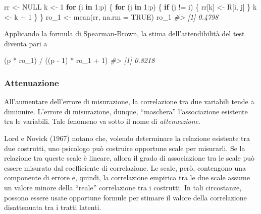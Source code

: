 \documentclass[
  11pt,
]{krantz}
\makeatletter
\newenvironment{Shaded}{\begin{snugshade}}{\end{snugshade}}
\newcommand{\AttributeTok}[1]{\textcolor[rgb]{0.61,0.61,0.61}{#1}}
\newcommand{\CommentTok}[1]{\textcolor[rgb]{0.37,0.37,0.37}{\textit{#1}}}
\newcommand{\ConstantTok}[1]{\textcolor[rgb]{0,0,0}{#1}}
\newcommand{\ControlFlowTok}[1]{\textcolor[rgb]{0.27,0.27,0.27}{\textbf{#1}}}
\newcommand{\DecValTok}[1]{\textcolor[rgb]{0.06,0.06,0.06}{#1}}
\newcommand{\FunctionTok}[1]{\textcolor[rgb]{0,0,0}{#1}}
\newcommand{\NormalTok}[1]{#1}
\newcommand{\OtherTok}[1]{\textcolor[rgb]{0.37,0.37,0.37}{#1}}
\newcommand{\SpecialCharTok}[1]{\textcolor[rgb]{0,0,0}{#1}}
\newenvironment{kframe}{%
\medskip{}
\setlength{\fboxsep}{.8em}
 \def\at@end@of@kframe{}%
 \ifinner\ifhmode%
  \def\at@end@of@kframe{\end{minipage}}%
  \begin{minipage}{\columnwidth}%
 \fi\fi%
 \def\FrameCommand##1{\hskip\@totalleftmargin \hskip-\fboxsep
 \colorbox{shadecolor}{##1}\hskip-\fboxsep
     \hskip-\linewidth \hskip-\@totalleftmargin \hskip\columnwidth}%
 \MakeFramed {\advance\hsize-\width
   \@totalleftmargin\z@ \linewidth\hsize
   \@setminipage}}%
 {\par\unskip\endMakeFramed%
 \at@end@of@kframe}
\renewenvironment{Shaded}{\begin{kframe}}{\end{kframe}}
\theoremstyle{definition}
\theoremstyle{definition}
\theoremstyle{definition}
\theoremstyle{definition}
\theoremstyle{remark}
\makeatother
\begin{document}
\begin{Shaded}
\begin{Highlighting}[]
\NormalTok{rr }\OtherTok{\textless{}{-}} \ConstantTok{NULL}
\NormalTok{k }\OtherTok{\textless{}{-}} \DecValTok{1}
\ControlFlowTok{for}\NormalTok{ (i }\ControlFlowTok{in} \DecValTok{1}\SpecialCharTok{:}\NormalTok{p) \{}
  \ControlFlowTok{for}\NormalTok{ (j }\ControlFlowTok{in} \DecValTok{1}\SpecialCharTok{:}\NormalTok{p) \{}
    \ControlFlowTok{if}\NormalTok{ (j }\SpecialCharTok{!=}\NormalTok{ i) \{}
\NormalTok{      rr[k] }\OtherTok{\textless{}{-}}\NormalTok{ R[i, j]}
\NormalTok{    \}}
\NormalTok{    k }\OtherTok{\textless{}{-}}\NormalTok{ k }\SpecialCharTok{+} \DecValTok{1}
\NormalTok{  \}}
\NormalTok{\}}
\NormalTok{ro\_1 }\OtherTok{\textless{}{-}} \FunctionTok{mean}\NormalTok{(rr, }\AttributeTok{na.rm =} \ConstantTok{TRUE}\NormalTok{)}
\NormalTok{ro\_1}
\CommentTok{\#\textgreater{} [1] 0.4798}
\end{Highlighting}
\end{Shaded}

Applicando la formula di Spearman-Brown, la stima dell'attendibilità del test diventa pari a

\begin{Shaded}
\begin{Highlighting}[]
\NormalTok{(p }\SpecialCharTok{*}\NormalTok{ ro\_1) }\SpecialCharTok{/}\NormalTok{ ((p }\SpecialCharTok{{-}} \DecValTok{1}\NormalTok{) }\SpecialCharTok{*}\NormalTok{ ro\_1 }\SpecialCharTok{+} \DecValTok{1}\NormalTok{)}
\CommentTok{\#\textgreater{} [1] 0.8218}
\end{Highlighting}
\end{Shaded}

\hypertarget{attenuazione-1}{%
\subsubsection{Attenuazione}\label{attenuazione-1}}

All'aumentare dell'errore di misurazione, la correlazione tra due variabili tende a diminuire. L'errore di misurazione, dunque, ``maschera'' l'associazione esistente tra le variabili. Tale fenomeno va sotto il nome di \emph{attenuazione}.

Lord e Novick (1967) notano che, volendo determinare la relazione esistente tra due costrutti, uno psicologo può costruire opportune scale per misurarli. Se la relazione tra queste scale è lineare, allora il grado di associazione tra le scale può essere misurato dal coefficiente di correlazione. Le scale, però, contengono una componente di errore e, quindi, la correlazione empirica tra le due scale assume un valore minore della ``reale'' correlazione tra i costrutti. In tali circostanze, possono essere usate opportune formule per stimare il valore della correlazione disattenuata tra i tratti latenti.
\end{document}

